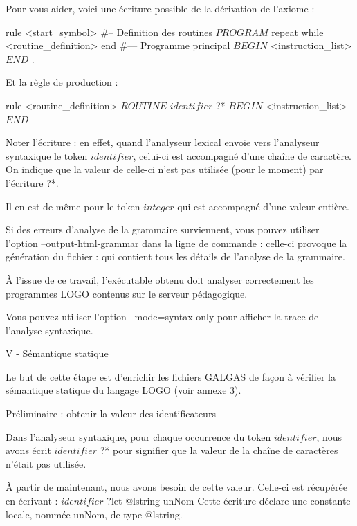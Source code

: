 Pour vous aider, voici une écriture possible de la dérivation de l'axiome :

\begin{galgascode}
rule <start_symbol> {
#-- Definition des routines
  $PROGRAM$
  repeat
  while
    <routine_definition>
  end
#--- Programme principal
  $BEGIN$
  <instruction_list> 
  $END$
  $.$
}
\end{galgascode}

Et la règle de production  :

\begin{galgascode}
rule <routine_definition> {
  $ROUTINE$
  $identifier$ ?*
  $BEGIN$
  <instruction_list>
  $END$
}
\end{galgascode}

Noter l’écriture  : en effet, quand l’analyseur lexical envoie vers l’analyseur syntaxique le token $identifier$, celui-ci est accompagné d’une chaîne de caractère. On indique que la valeur de celle-ci n’est pas utilisée (pour le moment) par l’écriture ?*.

Il en est de même pour le token $integer$ qui est accompagné d’une valeur entière.

Si des erreurs d'analyse de la grammaire surviennent, vous pouvez utiliser l'option --output-html-grammar dans la ligne de commande : celle-ci provoque la génération du fichier :
qui contient tous les détails de l'analyse de la grammaire.

À l'issue de ce travail, l'exécutable obtenu doit analyser correctement les programmes LOGO contenus sur le serveur pédagogique.

Vous pouvez utiliser l'option --mode=syntax-only pour afficher la trace de l'analyse syntaxique.

V - Sémantique statique

Le but de cette étape est d'enrichir les fichiers GALGAS de façon à vérifier la sémantique statique du langage LOGO (voir annexe 3).

Préliminaire : obtenir la valeur des identificateurs

Dans l’analyseur syntaxique, pour chaque occurrence du token $identifier$, nous avons écrit $identifier$ ?* pour signifier que la valeur de la chaîne de caractères n’était pas utilisée.

À partir de maintenant, nous avons besoin de cette valeur. Celle-ci est récupérée en écrivant :
$identifier$ ?let @lstring unNom
Cette écriture déclare une constante locale, nommée unNom, de type @lstring.

